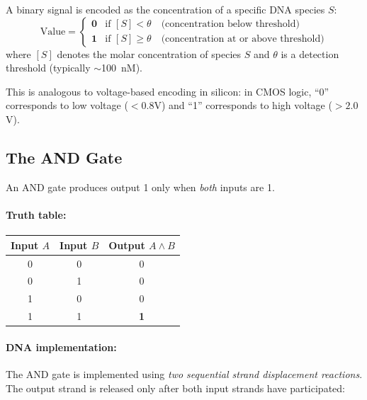 \begin{definition}
A binary signal is encoded as the concentration of a specific DNA species $S$:
\begin{equation}
\text{Value} = \begin{cases}
\mathbf{0} & \text{if } [S] < \theta \quad \text{(concentration below threshold)} \\
\mathbf{1} & \text{if } [S] \geq \theta \quad \text{(concentration at or above threshold)}
\end{cases}
\end{equation}
where $[S]$ denotes the molar concentration of species $S$ and $\theta$ is a detection threshold (typically $\sim$100~nM).
\end{definition}

This is analogous to voltage-based encoding in silicon: in CMOS logic, ``0'' corresponds to low voltage ($< 0.8$V) and ``1'' corresponds to high voltage ($> 2.0$V).

\subsection{The AND Gate}

An AND gate produces output 1 only when \emph{both} inputs are 1.

\paragraph{Truth table:}
\begin{center}
\renewcommand{\arraystretch}{1.15}
\begin{tabular}{cc|c}
\toprule
\textbf{Input $A$} & \textbf{Input $B$} & \textbf{Output $A \wedge B$} \\
\midrule
0 & 0 & 0 \\
0 & 1 & 0 \\
1 & 0 & 0 \\
1 & 1 & \textbf{1} \\
\bottomrule
\end{tabular}
\end{center}

\paragraph{DNA implementation:}
The AND gate is implemented using \emph{two sequential strand displacement reactions}. The output strand is released only after both input strands have participated:

